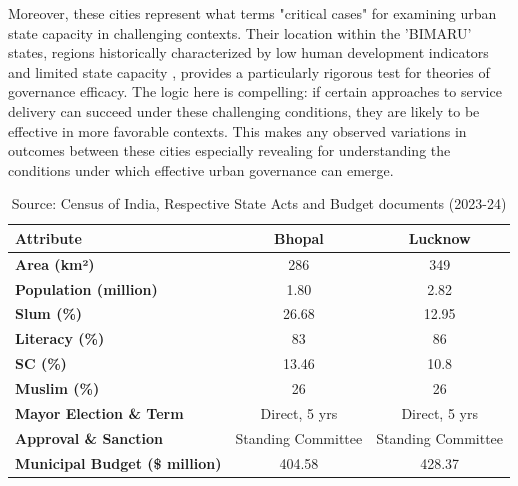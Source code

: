 Moreover, these cities represent what \citep{flyvbjerg_five_2006} terms "critical cases" for examining urban state capacity in challenging contexts. Their location within the 'BIMARU' states, regions historically characterized by low human development indicators and limited state capacity \citep{sharma_are_2015}, provides a particularly rigorous test for theories of governance efficacy. The logic here is compelling: if certain approaches to service delivery can succeed under these challenging conditions, they are likely to be effective in more favorable contexts. This makes any observed variations in outcomes between these cities especially revealing for understanding the conditions under which effective urban governance can emerge.


\begin{table}[H]
\centering
\caption{City Comparison: Bhopal and Lucknow}
\begin{tabular}{|l|c|c|}
\hline
\textbf{Attribute}               & \textbf{Bhopal}  & \textbf{Lucknow} \\ \hline
\textbf{Area (km²)}              & 286              & 349             \\ \hline
\textbf{Population (million)}    & 1.80             & 2.82            \\ \hline
\textbf{Slum (\%)\footnotemark}  & 26.68            & 12.95           \\ \hline
\textbf{Literacy (\%)}           & 83               & 86              \\ \hline
\textbf{SC (\%)}                 & 13.46            & 10.8            \\ \hline
\textbf{Muslim (\%)}             & 26               & 26              \\ \hline
\textbf{Mayor Election \& Term}  & Direct, 5 yrs    & Direct, 5 yrs   \\ \hline
\textbf{Approval \& Sanction}    & Standing Committee & Standing Committee \\ \hline
\textbf{Municipal Budget (\$ million)} & 404.58           & 428.37           \\ \hline
\end{tabular}
\caption*{Source: Census of India, Respective State Acts and Budget documents (2023-24)}
\end{table}

